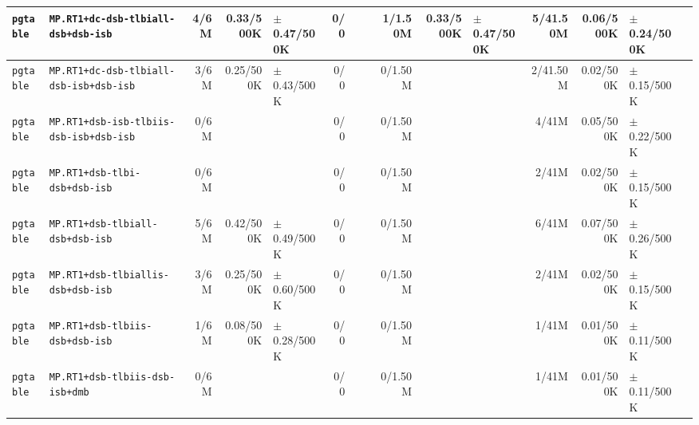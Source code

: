 \begin{tabular}{l l  | r r l | r r l | r r l | r r l l}
        \verb|pgtable| &                    \verb|MP.RT1+dc-dsb-tlbiall-dsb+dsb-isb| &           4/6M &             0.33/500K &   $\pm$ 0.47/500K &            0/0 &                       &  &        1/1.50M &             0.33/500K &   $\pm$ 0.47/500K &       5/41.50M &             0.06/500K &    $\pm$ 0.24/500K & \\ \hline 
        \verb|pgtable| &                \verb|MP.RT1+dc-dsb-tlbiall-dsb-isb+dsb-isb| &           3/6M &             0.25/500K &   $\pm$ 0.43/500K &            0/0 &                       &  &        0/1.50M &                       &                   &       2/41.50M &             0.02/500K &    $\pm$ 0.15/500K & \\ \hline 
        \verb|pgtable| &                \verb|MP.RT1+dsb-isb-tlbiis-dsb-isb+dsb-isb| &           0/6M &                       &                   &            0/0 &                       &  &        0/1.50M &                       &                   &          4/41M &             0.05/500K &    $\pm$ 0.22/500K & \\ \hline 
        \verb|pgtable| &                          \verb|MP.RT1+dsb-tlbi-dsb+dsb-isb| &           0/6M &                       &                   &            0/0 &                       &  &        0/1.50M &                       &                   &          2/41M &             0.02/500K &    $\pm$ 0.15/500K & \\ \hline 
        \verb|pgtable| &                       \verb|MP.RT1+dsb-tlbiall-dsb+dsb-isb| &           5/6M &             0.42/500K &   $\pm$ 0.49/500K &            0/0 &                       &  &        0/1.50M &                       &                   &          6/41M &             0.07/500K &    $\pm$ 0.26/500K & \\ \hline 
        \verb|pgtable| &                     \verb|MP.RT1+dsb-tlbiallis-dsb+dsb-isb| &           3/6M &             0.25/500K &   $\pm$ 0.60/500K &            0/0 &                       &  &        0/1.50M &                       &                   &          2/41M &             0.02/500K &    $\pm$ 0.15/500K & \\ \hline 
        \verb|pgtable| &                        \verb|MP.RT1+dsb-tlbiis-dsb+dsb-isb| &           1/6M &             0.08/500K &   $\pm$ 0.28/500K &            0/0 &                       &  &        0/1.50M &                       &                   &          1/41M &             0.01/500K &    $\pm$ 0.11/500K & \\ \hline 
        \verb|pgtable| &                        \verb|MP.RT1+dsb-tlbiis-dsb-isb+dmb| &           0/6M &                       &                   &            0/0 &                       &  &        0/1.50M &                       &                   &          1/41M &             0.01/500K &    $\pm$ 0.11/500K & \\ \hline 

\end{tabular}
